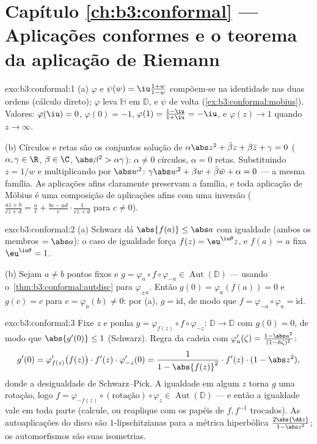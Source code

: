 \section*{Capítulo \ref{ch:b3:conformal} --- Aplicações conformes e
o teorema da aplicação de Riemann}

\begin{solution}{exo:b3:conformal:1}
(a) $\varphi$ e $\psi(w) = \iu\frac{1+w}{1-w}$ compõem-se na
identidade nas duas ordens (cálculo direto); $\varphi$
leva $\mathbb H$ em $\mathbb D$, e $\psi$ de volta
(\cref{ex:b3:conformal:mobius}). Valores: $\varphi(\iu) = 0$,
$\varphi(0) = -1$, $\varphi(1) = \frac{1 - \iu}{1 + \iu} =
-\iu$, e $\varphi(z) \to 1$ quando $z \to \infty$.

(b) Círculos e retas são os conjuntos solução de
$\alpha\abs z^2 + \bar\beta z + \beta\bar z + \gamma = 0$
($\alpha, \gamma \in \R$, $\beta \in \C$, $\abs\beta^2 >
\alpha\gamma$): $\alpha \neq 0$ círculos, $\alpha = 0$ retas.
Substituindo $z = 1/w$ e multiplicando por $\abs w^2$:
$\gamma\abs w^2 + \beta w + \bar\beta\bar w + \alpha = 0$ ---
a mesma família. As aplicações afins claramente preservam a família, e
toda aplicação de Möbius é uma composição de aplicações afins com uma
inversão ($\frac{az+b}{cz+d} = \frac ac + \frac{bc -
ad}{c}\cdot\frac1{cz + d}$ para $c \neq 0$).
\end{solution}

\begin{solution}{exo:b3:conformal:2}
(a) Schwarz dá $\abs{f(a)} \leq \abs a$ com igualdade (ambos os
membros $= \abs a$): o caso de igualdade força $f(z) =
\eu^{\iu\theta}z$, e $f(a) = a$ fixa $\eu^{\iu\theta} = 1$.

(b) Sejam $a \neq b$ pontos fixos e $g =
\varphi_a\circ f\circ\varphi_{-a} \in
\operatorname{Aut}(\mathbb D)$ --- usando
o~\cref{thm:b3:conformal:autdisc} para $\varphi_{\pm a}$. Então
$g(0) = \varphi_a(f(a)) = 0$ e $g(c) = c$ para $c =
\varphi_a(b) \neq 0$: por (a), $g = \mathrm{id}$, de modo que $f =
\varphi_{-a}\circ\varphi_a = \mathrm{id}$.
\end{solution}

\begin{solution}{exo:b3:conformal:3}
Fixe $z$ e ponha $g = \varphi_{f(z)}\circ f\circ\varphi_{-z}$:
 $\mathbb D \to \mathbb D$ com $g(0) = 0$, de modo que
$\abs{g'(0)} \leq 1$ (Schwarz). Regra da cadeia com
$\varphi_a'(\zeta) = \frac{1 - \abs a^2}{(1 - \bar
a\zeta)^2}$:
\[
g'(0) = \varphi_{f(z)}'\bigl(f(z)\bigr)\cdot f'(z)\cdot
\varphi_{-z}'(0)
= \frac{1}{1 - \abs{f(z)}^2}\cdot f'(z)\cdot(1 - \abs z^2),
\]
donde a desigualdade de Schwarz--Pick. A igualdade em algum $z$
torna $g$ uma rotação, logo $f =
\varphi_{-f(z)}\circ(\text{rotação})\circ\varphi_z \in
\operatorname{Aut}(\mathbb D)$ --- e então a igualdade vale
em toda parte (calcule, ou reaplique com os papéis de $f, f^{-1}$
trocados). As autoaplicações  do disco são
$1$-lipschitzianas para a métrica hiperbólica $\frac{2\abs{\dd
z}}{1 - \abs z^2}$; os automorfismos são suas isometrias.
\end{solution}

